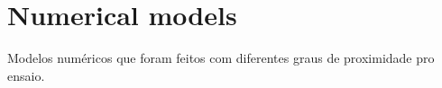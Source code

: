 \section{Numerical models} \label{sec:numerical_models}
Modelos numéricos que foram feitos com diferentes graus de proximidade pro ensaio.
